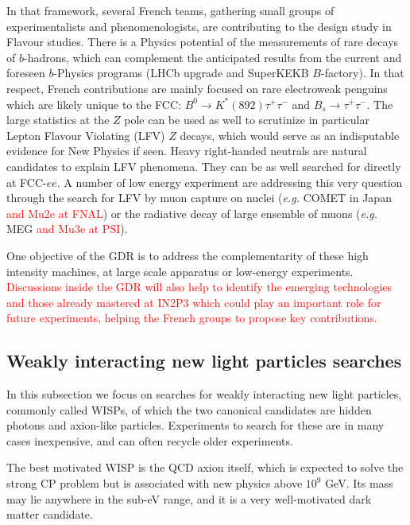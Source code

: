 In that framework, several French teams, gathering small groups of experimentalists and phenomenologists, are contributing to the design study in Flavour studies.  
There is a Physics potential of the measurements of rare decays of $b$-hadrons, which can complement  the anticipated results from the current and foreseen $b$-Physics programs (LHCb upgrade and SuperKEKB $B$-factory). In that respect, French contributions are mainly focused on rare electroweak penguins which are likely unique to the FCC: $B^0 \to K^*(892) \tau^+\tau^-$ and $B_s \to \tau^+ \tau^-$.   
The large statistics at the $Z$ pole can be used as well to scrutinize in particular Lepton Flavour Violating (LFV) $Z$ decays, which would serve as an indisputable evidence for New Physics if seen. Heavy right-handed neutrals are natural candidates to explain LFV phenomena. They can be as well searched for directly at FCC-$ee$. A number of low energy experiment are addressing this very question through the search for LFV by muon capture on nuclei ({\it e.g.} COMET in Japan \textcolor{red}{and Mu2e at FNAL}) or the radiative decay of large ensemble of muons ({\it e.g.} MEG \textcolor{red}{and Mu3e at PSI}). 

One objective of the GDR is to address the complementarity of these high intensity machines,  at large scale apparatus or low-energy experiments.  \textcolor{red}{Discussions inside the GDR will also help to identify the emerging technologies and those already mastered at IN2P3 which could play an important role for future experiments, helping the French groups to propose key contributions.} 

\subsection{Weakly interacting new light particles searches}

In this subsection we focus on searches for weakly interacting new light particles, commonly called WISPs, of which the two canonical candidates are hidden photons and axion-like particles. Experiments to search for these are in many cases inexpensive, and can often recycle older experiments. 


The best motivated WISP is the QCD axion itself, which is expected to solve the strong CP problem but is associated with new physics above $10^9$ GeV. Its mass may lie anywhere in the sub-eV range, and it is a very well-motivated dark matter candidate. 


